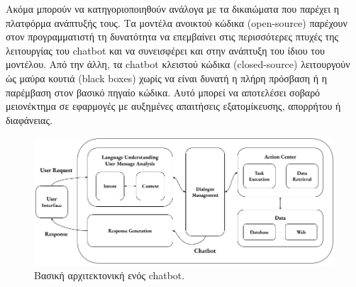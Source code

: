 \documentclass{article}
\begin{document}
\par Ακόμα μπορούν να κατηγοριοποιηθούν ανάλογα με τα δικαιώματα που παρέχει η πλατφόρμα ανάπτυξής τους. Tα μοντέλα ανοικτού κώδικα (open-source) παρέχουν στον προγραμματιστή τη δυνατότητα να επεμβαίνει στις περισσότερες πτυχές της λειτουργίας του chatbot και να συνεισφέρει και στην ανάπτυξη του ίδιου του μοντέλου. Από την άλλη, τα chatbot κλειστού κώδικα (closed-source) λειτουργούν ώς μαύρα κουτιά (black boxes) χωρίς να είναι δυνατή η πλήρη πρόσβαση ή η παρέμβαση στον βασικό πηγαίο κώδικα. Αυτό μπορεί να αποτελέσει σοβαρό μειονέκτημα σε εφαρμογές με αυξημένες απαιτήσεις εξατομίκευσης, απορρήτου ή διαφάνειας.
\begin{figure}[h]
    \centering
    \includegraphics[width=1\linewidth]{figures/2.1.cbt_arch.png}
    \caption{Βασική αρχιτεκτονική ενός chatbot.}
    \label{fig:enter-label}
\end{figure}
\end{document}
